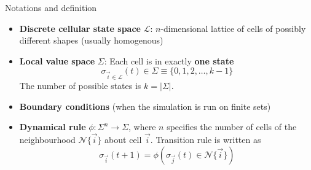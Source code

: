 \begin{frame}{Notations and definition}
	  \begin{itemize}
	  \item \textbf{Discrete cellular state space} $\mathcal{L}$: $n$-dimensional lattice of cells of possibly different shapes (usually homogenous)
	  \item \textbf{Local value space} $\Sigma$: Each cell is in exactly \textbf{one state} $$\sigma_{\vec{i}\in \mathcal{L}}(t) \in \Sigma\equiv \{0,1,2,\dots,k-1 \}$$ The number of possible states is  $k =|\Sigma|$. 
   \item \textbf{Boundary conditions} (when the simulation is run on finite sets)
	  \item \textbf{Dynamical rule} $\phi: \Sigma^n \to \Sigma$, where $n$ specifies the number of cells of the neighbourhood $\mathcal{N}\{\vec{i}\}$ about cell $\vec{i}$. Transition rule is written as
        $$\sigma_{\vec{i}}(t+1) = \phi(\sigma_{\vec{j}}(t)\in \mathcal{N}\{\vec{i}\})$$ 
	  \end{itemize}
	
	

\end{frame}


